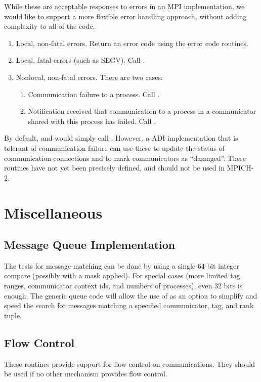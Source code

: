 \documentclass{article}
\begin{document}
While these are acceptable responses to errors in an MPI
implementation, we would like to support a more flexible error
handling approach, without adding complexity to all of the code.
\begin{enumerate}
\item Local, non-fatal errors.  Return an error code using the error
code routines.
\item Local, fatal errors (such as SEGV).  Call .
\item Nonlocal, non-fatal errors.  There are two cases:
   \begin{enumerate}
   \item Communication failure to a process.  Call
       .
   \item Notification received that communication to a process in a 
       communicator shared with this process has failed.  Call 
       .
   \end{enumerate}
\end{enumerate}
By default,  and  would simply
call .  However, a ADI implementation that is
tolerant of communication failure can use these to update the status
of communication connections and to mark communicators as
``damaged''.  These routines have not yet been precisely defined, and
should not be used in MPICH-2.

%

\section{Miscellaneous}
\label{sec:misc}

\subsection{Message Queue Implementation}
The tests for message-matching can be done by using a single 64-bit
integer compare (possibly with a mask applied).  For special cases
(more limited tag ranges, communicator context ids, and numbers of
processes), even 32 bits is enough.  The generic queue code will allow
the use of  as an option to simplify and speed the
search for messages matching a specified communicator, tag, and rank
tuple.

\subsection{Flow Control}
\label{sec:flow-control}
These routines provide support for flow control on communications.
They should be used if no other mechanism provides flow control.
\end{document}

